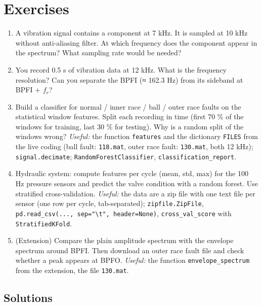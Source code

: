 \documentclass[
  letterpaper,
  DIV=11,
  numbers=noendperiod]{scrreprt}
\providecommand{\tightlist}{%
  \setlength{\itemsep}{0pt}\setlength{\parskip}{0pt}}\usepackage{longtable,booktabs,array}
\begin{document}
\section{Exercises}\label{exercises-10}

\begin{enumerate}
\def\labelenumi{\arabic{enumi}.}
\tightlist
\item
  A vibration signal contains a component at 7 kHz. It is sampled at 10
  kHz without anti-aliasing filter. At which frequency does the
  component appear in the spectrum? What sampling rate would be needed?
\item
  You record 0.5 s of vibration data at 12 kHz. What is the frequency
  resolution? Can you separate the BPFI (≈ 162.3 Hz) from its sideband
  at BPFI + \(f_r\)?
\item
  Build a classifier for normal / inner race / ball / outer race faults
  on the statistical window features. Split each recording in time
  (first 70 \% of the windows for training, last 30 \% for testing). Why
  is a random split of the windows wrong? \emph{Useful:} the function
  \texttt{features} and the dictionary \texttt{FILES} from the live
  coding (ball fault: \texttt{118.mat}, outer race fault:
  \texttt{130.mat}, both 12 kHz); \texttt{signal.decimate};
  \texttt{RandomForestClassifier}, \texttt{classification\_report}.
\item
  Hydraulic system: compute features per cycle (mean, std, max) for the
  100 Hz pressure sensors and predict the valve condition with a random
  forest. Use stratified cross-validation. \emph{Useful:} the data are a
  zip file with one text file per sensor (one row per cycle,
  tab-separated); \texttt{zipfile.ZipFile},
  \texttt{pd.read\_csv(...,\ sep="\textbackslash{}t",\ header=None)},
  \texttt{cross\_val\_score} with \texttt{StratifiedKFold}.
\item
  (Extension) Compare the plain amplitude spectrum with the envelope
  spectrum around BPFI. Then download an outer race fault file and check
  whether a peak appears at BPFO. \emph{Useful:} the function
  \texttt{envelope\_spectrum} from the extension, the file
  \texttt{130.mat}.
\end{enumerate}

\subsection{Solutions}\label{solutions-10}
\end{document}
